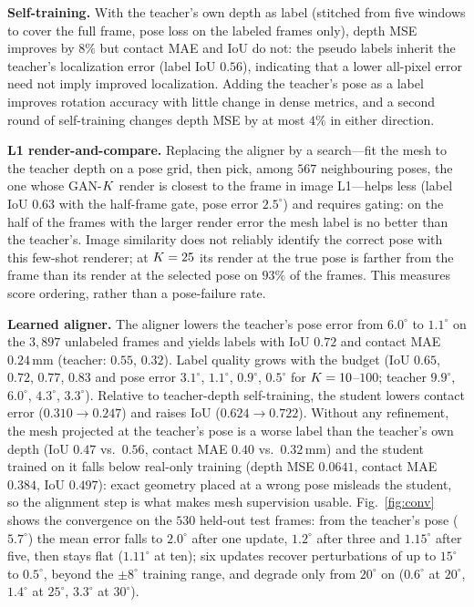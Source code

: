 \noindent\textbf{Self-training.} With the teacher's own depth as label (stitched from five windows to cover the full frame, pose loss on the labeled frames only), depth MSE improves by $8\%$ but contact MAE and IoU do not: the pseudo labels inherit the teacher's localization error (label IoU $0.56$), indicating that a lower all-pixel error need not imply improved localization. Adding the teacher's pose as a label improves rotation accuracy with little change in dense metrics, and a second round of self-training changes depth MSE by at most $4\%$ in either direction.

\noindent\textbf{L1 render-and-compare.} Replacing the aligner by a search---fit the mesh to the teacher depth on a pose grid, then pick, among $567$ neighbouring poses, the one whose GAN-$K$ render is closest to the frame in image L1---helps less (label IoU $0.63$ with the half-frame gate, pose error $2.5^\circ$) and requires gating: on the half of the frames with the larger render error the mesh label is no better than the teacher's. Image similarity does not reliably identify the correct pose with this few-shot renderer; at $K=25$ its render at the true pose is farther from the frame than its render at the selected pose on $93\%$ of the frames. This measures score ordering, rather than a pose-failure rate.

\noindent\textbf{Learned aligner.} The aligner lowers the teacher's pose error from $6.0^\circ$ to $1.1^\circ$ on the $3{,}897$ unlabeled frames and yields labels with IoU $0.72$ and contact MAE $0.24\,$mm (teacher: $0.55$, $0.32$). Label quality grows with the budget (IoU $0.65$, $0.72$, $0.77$, $0.83$ and pose error $3.1^\circ$, $1.1^\circ$, $0.9^\circ$, $0.5^\circ$ for $K=10$--$100$; teacher $9.9^\circ$, $6.0^\circ$, $4.3^\circ$, $3.3^\circ$). Relative to teacher-depth self-training, the student lowers contact error ($0.310\!\to\!0.247$) and raises IoU ($0.624\!\to\!0.722$). Without any refinement, the mesh projected at the teacher's pose is a worse label than the teacher's own depth (IoU $0.47$ vs.\ $0.56$, contact MAE $0.40$ vs.\ $0.32\,$mm) and the student trained on it falls below real-only training (depth MSE $0.0641$, contact MAE $0.384$, IoU $0.497$): exact geometry placed at a wrong pose misleads the student, so the alignment step is what makes mesh supervision usable. Fig.~\ref{fig:conv} shows the convergence on the $530$ held-out test frames: from the teacher's pose ($5.7^\circ$) the mean error falls to $2.0^\circ$ after one update, $1.2^\circ$ after three and $1.15^\circ$ after five, then stays flat ($1.11^\circ$ at ten); six updates recover perturbations of up to $15^\circ$ to $0.5^\circ$, beyond the $\pm8^\circ$ training range, and degrade only from $20^\circ$ on ($0.6^\circ$ at $20^\circ$, $1.4^\circ$ at $25^\circ$, $3.3^\circ$ at $30^\circ$).

